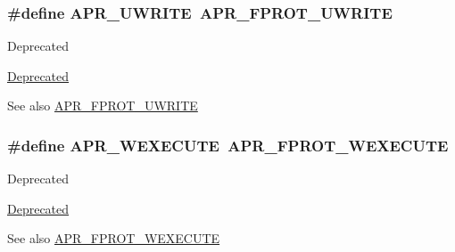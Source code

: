 \subsubsection[{\texorpdfstring{A\+P\+R\+\_\+\+U\+W\+R\+I\+TE}{APR_UWRITE}}]{\setlength{\rightskip}{0pt plus 5cm}\#define A\+P\+R\+\_\+\+U\+W\+R\+I\+TE~{\bf A\+P\+R\+\_\+\+F\+P\+R\+O\+T\+\_\+\+U\+W\+R\+I\+TE}}\hypertarget{group__apr__file__permissions_ga4faa7fdfa3bcda569dd1e23ae002c5e5}{}\label{group__apr__file__permissions_ga4faa7fdfa3bcda569dd1e23ae002c5e5}
\begin{DoxyRefDesc}{Deprecated}
\item[\hyperlink{deprecated__deprecated000005}{Deprecated}]\end{DoxyRefDesc}
\begin{DoxySeeAlso}{See also}
\hyperlink{group__apr__file__permissions_ga50b985779b15fbfdae0758e98ffb92af}{A\+P\+R\+\_\+\+F\+P\+R\+O\+T\+\_\+\+U\+W\+R\+I\+TE} 
\end{DoxySeeAlso}
\subsubsection[{\texorpdfstring{A\+P\+R\+\_\+\+W\+E\+X\+E\+C\+U\+TE}{APR_WEXECUTE}}]{\setlength{\rightskip}{0pt plus 5cm}\#define A\+P\+R\+\_\+\+W\+E\+X\+E\+C\+U\+TE~{\bf A\+P\+R\+\_\+\+F\+P\+R\+O\+T\+\_\+\+W\+E\+X\+E\+C\+U\+TE}}\hypertarget{group__apr__file__permissions_ga7bf4afea195c62f41aad1d3e94dcdac6}{}\label{group__apr__file__permissions_ga7bf4afea195c62f41aad1d3e94dcdac6}
\begin{DoxyRefDesc}{Deprecated}
\item[\hyperlink{deprecated__deprecated000014}{Deprecated}]\end{DoxyRefDesc}
\begin{DoxySeeAlso}{See also}
\hyperlink{group__apr__file__permissions_ga760d69c09b38ddf1e0aff09362d8ce11}{A\+P\+R\+\_\+\+F\+P\+R\+O\+T\+\_\+\+W\+E\+X\+E\+C\+U\+TE} 
\end{DoxySeeAlso}
